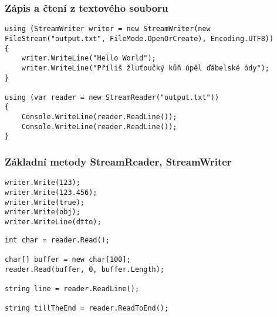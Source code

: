 \begin{frame}[fragile]
\frametitle{Zápis a čtení z textového souboru}
\begin{yesblock}
\begin{lstlisting}
using (StreamWriter writer = new StreamWriter(new FileStream("output.txt", FileMode.OpenOrCreate), Encoding.UTF8))
{
    writer.WriteLine("Hello World");
    writer.WriteLine("Příliš žluťoučký kůň úpěl ďábelské ódy");
}

using (var reader = new StreamReader("output.txt"))
{
    Console.WriteLine(reader.ReadLine());
    Console.WriteLine(reader.ReadLine());
}
\end{lstlisting}
\end{yesblock}
\end{frame}


\begin{frame}[fragile]
\frametitle{Základní metody StreamReader, StreamWriter}
\vfill
\begin{yesblock}
\begin{lstlisting}
writer.Write(123);
writer.Write(123.456);
writer.Write(true);
writer.Write(obj);
writer.WriteLine(dtto);
\end{lstlisting}
\end{yesblock}
\vfill
\begin{yesblock}
\begin{lstlisting}
int char = reader.Read();

char[] buffer = new char[100];
reader.Read(buffer, 0, buffer.Length);

string line = reader.ReadLine();

string tillTheEnd = reader.ReadToEnd();
\end{lstlisting}
\end{yesblock}
\vfill
\end{frame}



